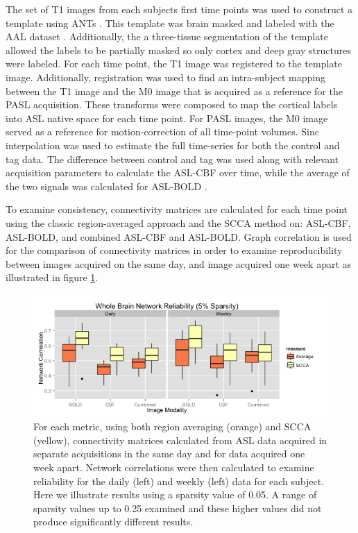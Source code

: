 \documentclass{llncs}
\begin{document}
 The set of T1 images from each subjects first time points was used to construct a template using ANTs \cite{Avants2011}. This template was brain masked and labeled with the AAL dataset \cite{Tzourio-Mazoyer2002}. Additionally, the a three-tissue segmentation of the template allowed the labels to be partially masked so only cortex and deep gray structures were labeled. For each time point, the T1 image was registered to the template image. Additionally, registration was used to find an intra-subject mapping between the T1 image and the M0 image that is acquired as a reference for the PASL acquisition. These transforms were composed to map the cortical labels into ASL native space for each time point. For PASL images, the M0 image served as a reference for motion-correction of all time-point volumes. Sinc interpolation was used to estimate the full time-series for both the control and tag data. The difference between control and tag was used along with relevant acquisition parameters to calculate the ASL-CBF over time, while the average of the two signals was calculated for ASL-BOLD \cite{Wong1997}. 

To examine consistency, connectivity matrices are calculated for each time point using the classic region-averaged approach and the SCCA method on: ASL-CBF, ASL-BOLD, and combined ASL-CBF and ASL-BOLD. Graph correlation \cite{vanWijk2010} is used for the comparison of connectivity matrices in order to examine reproducibility between images acquired on the same day, and image acquired one week apart as illustrated in figure \ref{fig:testretest}.

\begin{figure}[tb]
\begin{center}
\includegraphics[width=0.75\linewidth]{retest.png} 
\caption{For each metric, using both region averaging (orange) and SCCA (yellow), connectivity matrices calculated from ASL data acquired in separate acquisitions in the same day and for data acquired one week apart. Network correlations were then calculated to examine reliability for the daily (left) and weekly (left) data for each subject. Here we illustrate results using a sparsity value of 0.05. A range of sparsity values up to 0.25 examined and these higher values did not produce significantly different results.}
\label{fig:testretest}
\end{center}
\end{figure}
\end{document}
